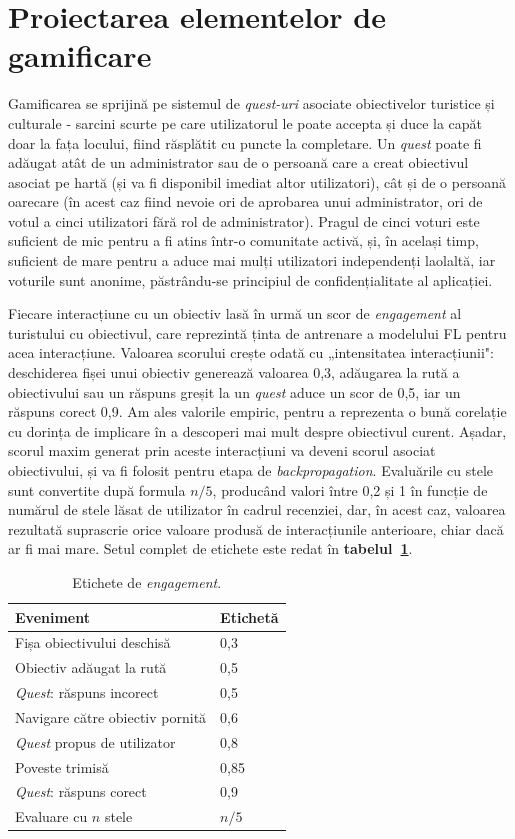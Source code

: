 \documentclass[12pt,a4paper]{report}
\begin{document}
\section{Proiectarea elementelor de gamificare}

Gamificarea se sprijină pe sistemul de \textit{quest-uri} asociate obiectivelor turistice și culturale - sarcini scurte pe care utilizatorul le poate accepta și duce la capăt doar la fața locului, fiind răsplătit cu puncte la completare. Un \textit{quest} poate fi adăugat atât de un administrator sau de o persoană care a creat obiectivul asociat pe hartă (și va fi disponibil imediat altor utilizatori), cât și de o persoană oarecare (în acest caz fiind nevoie ori de aprobarea unui administrator, ori de votul a cinci utilizatori fără rol de administrator). Pragul de cinci voturi este suficient de mic pentru a fi atins într-o comunitate activă, și, în același timp, suficient de mare pentru a aduce mai mulți utilizatori independenți laolaltă, iar voturile sunt anonime, păstrându-se principiul de confidențialitate al aplicației.

Fiecare interacțiune cu un obiectiv lasă în urmă un scor de \textit{engagement} al turistului cu obiectivul, care reprezintă ținta de antrenare a modelului FL pentru acea interacțiune. Valoarea scorului crește odată cu „intensitatea interacțiunii": deschiderea fișei unui obiectiv generează valoarea 0,3, adăugarea la rută a obiectivului sau un răspuns greșit la un \textit{quest} aduce un scor de 0,5, iar un răspuns corect 0,9. Am ales valorile empiric, pentru a reprezenta o bună corelație cu dorința de implicare în a descoperi mai mult despre obiectivul curent. Așadar, scorul maxim generat prin aceste interacțiuni va deveni scorul asociat obiectivului, și va fi folosit pentru etapa de \textit{backpropagation}. Evaluările cu stele sunt convertite după formula $n/5$, producând valori între 0,2 și 1 în funcție de numărul de stele lăsat de utilizator în cadrul recenziei, dar, în acest caz, valoarea rezultată suprascrie orice valoare produsă de interacțiunile anterioare, chiar dacă ar fi mai mare. Setul complet de etichete este redat în \textbf{tabelul~\ref{tab:engagement}}.

\begin{table}[h]
\centering
\footnotesize
\caption{Etichete de \textit{engagement}.}
\label{tab:engagement}
\begin{tabular}{|l|l|}
\hline
\textbf{Eveniment} & \textbf{Etichetă} \\
\hline
Fișa obiectivului deschisă & 0,3 \\
\hline
Obiectiv adăugat la rută & 0,5 \\
\hline
\textit{Quest}: răspuns incorect & 0,5 \\
\hline
Navigare către obiectiv pornită & 0,6 \\
\hline
\textit{Quest} propus de utilizator & 0,8 \\
\hline
Poveste trimisă & 0,85 \\
\hline
\textit{Quest}: răspuns corect & 0,9 \\
\hline
Evaluare cu $n$ stele & $n/5$ \\
\hline
\end{tabular}
\end{table}
\end{document}
